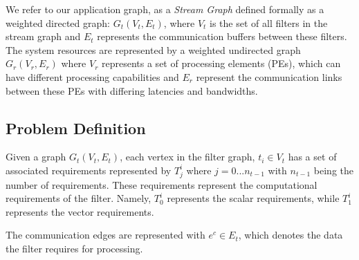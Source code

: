 \documentclass[10pt, conference, compsocconf]{IEEEtran}
\begin{document}
We refer to our application graph, as a \textit{Stream Graph} defined
formally as a weighted directed graph: $G_t(V_t, E_t)$, where $V_t$ is
the set of all filters in the stream graph and $E_t$ represents the
communication buffers between these filters. The system resources are
represented by a weighted undirected graph $G_r(V_r, E_r)$ where $V_r$
represents a set of processing elements (PEs), which can have different
processing capabilities and $E_r$ represent the communication links
between these PEs with differing latencies and
bandwidths. %

\subsection{Problem Definition}

Given a graph $G_t(V_t, E_t)$, each vertex in the filter graph, $t_i \in
V_t$ has a set of associated requirements represented by $T^{i}_{j}$
where $j=0...n_{t-1}$ with $n_{t-1}$ being the number of
requirements. These requirements represent the computational
requirements of the filter. Namely, $T^i_0$ represents the scalar
requirements, while $T^i_1$ represents the vector requirements.


The communication edges are represented with \mbox{$e^c \in E_t$}, which
denotes the data the filter requires for processing.
\end{document}
